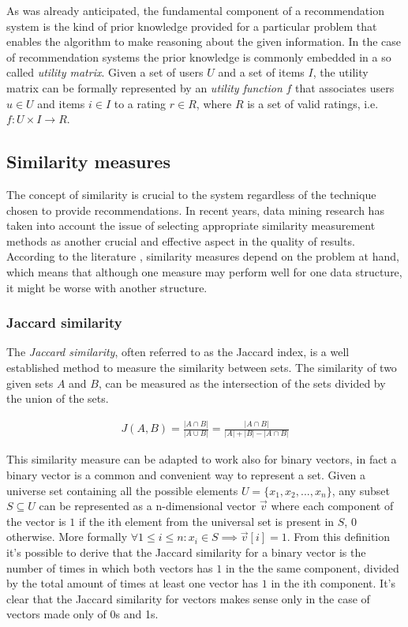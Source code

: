 As was already anticipated, the fundamental component of a recommendation system is the kind of prior knowledge provided for a particular problem that enables the algorithm to make reasoning about the given information. In the case of recommendation systems the prior knowledge is commonly embedded in a so called \emph{utility matrix}. Given a set of users $U$ and a set of items $I$, the utility matrix can be formally represented by an \emph{utility function} $f$ that associates users $u \in U$ and items $i \in I$ to a rating $r \in R$, where $R$ is a set of valid ratings, i.e. $f: U \times I \to R$.


\subsection{Similarity measures} \label{similatrity_measures}
The concept of similarity is crucial to the system regardless of the technique chosen to provide recommendations.  In recent years, data mining research has taken into account the issue of selecting appropriate similarity measurement methods as another crucial and effective aspect in the quality of results. According to the literature \cite{similarity_approaches}, similarity measures depend on the problem at hand, which means that although one measure may perform well for one data structure, it might be worse with another structure. 

\subsubsection{Jaccard similarity}\label{similarity_measure_jaccard}
The \emph{Jaccard similarity}, often referred to as the Jaccard index, is a well established method to measure the similarity between sets. The similarity of two given sets $A$ and $B$, can be measured as the intersection of the sets divided by the union of the sets.

\begin{equation}
\begin{aligned}
J(A,B) = \frac{|A \cap B|}{|A \cup B|} = \frac{|A \cap B|}{|A| + |B| - |A \cap B|}
\end{aligned}
\end{equation}

This similarity measure can be adapted to work also for binary vectors, in fact a binary vector is a common and convenient way to represent a set. Given a universe set containing all the possible elements $U=\{x_1, x_2, ..., x_n\}$, any subset $S \subseteq U$ can be represented as a n-dimensional vector $\vec{v}$ where each component of the vector is $1$ if the ith element from the universal set is present in $S$, $0$ otherwise. More formally $\forall 1 \leq i \leq n \colon x_i \in S \implies \vec{v}[i] = 1$. From this definition it's possible to derive that the Jaccard similarity for a binary vector is the number of times in which both vectors has $1$ in the the same component, divided by the total amount of times at least one vector has $1$ in the ith component. It's clear that the Jaccard similarity for vectors makes sense only in the case of vectors made only of 0s and 1s.

